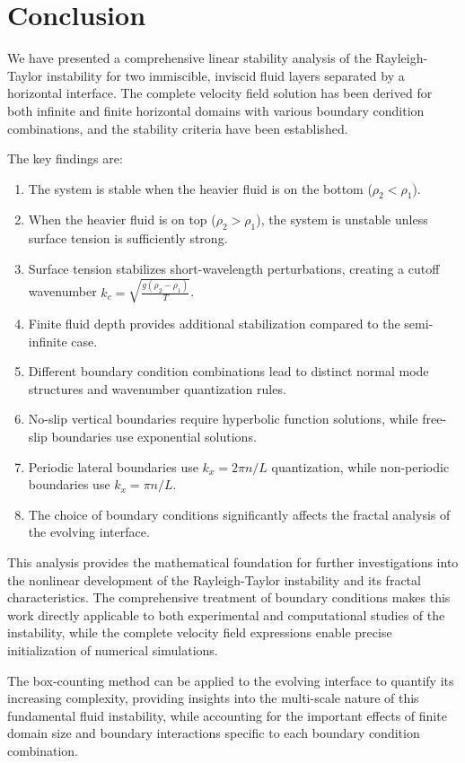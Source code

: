 \documentclass[12pt,a4paper]{article}
\begin{document}
\section{Conclusion}
We have presented a comprehensive linear stability analysis of the Rayleigh-Taylor instability for two immiscible, inviscid fluid layers separated by a horizontal interface. The complete velocity field solution has been derived for both infinite and finite horizontal domains with various boundary condition combinations, and the stability criteria have been established.

The key findings are:
\begin{enumerate}
    \item The system is stable when the heavier fluid is on the bottom ($\rho_2 < \rho_1$).
    \item When the heavier fluid is on top ($\rho_2 > \rho_1$), the system is unstable unless surface tension is sufficiently strong.
    \item Surface tension stabilizes short-wavelength perturbations, creating a cutoff wavenumber $k_c = \sqrt{\frac{g(\rho_2 - \rho_1)}{T}}$.
    \item Finite fluid depth provides additional stabilization compared to the semi-infinite case.
    \item Different boundary condition combinations lead to distinct normal mode structures and wavenumber quantization rules.
    \item No-slip vertical boundaries require hyperbolic function solutions, while free-slip boundaries use exponential solutions.
    \item Periodic lateral boundaries use $k_x = 2\pi n/L$ quantization, while non-periodic boundaries use $k_x = \pi n/L$.
    \item The choice of boundary conditions significantly affects the fractal analysis of the evolving interface.
\end{enumerate}

This analysis provides the mathematical foundation for further investigations into the nonlinear development of the Rayleigh-Taylor instability and its fractal characteristics. The comprehensive treatment of boundary conditions makes this work directly applicable to both experimental and computational studies of the instability, while the complete velocity field expressions enable precise initialization of numerical simulations.

The box-counting method can be applied to the evolving interface to quantify its increasing complexity, providing insights into the multi-scale nature of this fundamental fluid instability, while accounting for the important effects of finite domain size and boundary interactions specific to each boundary condition combination.
\end{document}
